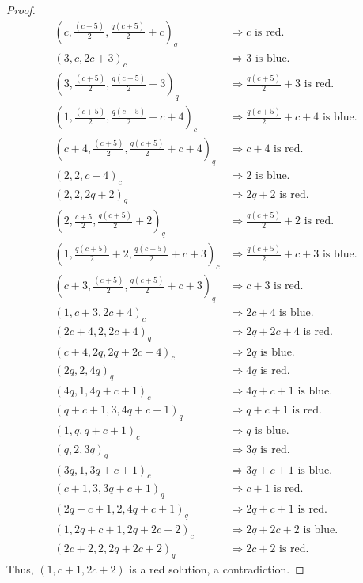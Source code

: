 \documentclass[10pt,a4paper]{amsart}
\begin{document}
\begin{proof}
\begin{align*}
(c,\tfrac{(c+5)}{2},\tfrac{q(c+5)}{2}+c)_q&\Longrightarrow c \text{ is red.}\\
(3,c,2c+3)_c&\Longrightarrow 3 \text{ is blue.}\\
(3,\tfrac{(c+5)}{2},\tfrac{q(c+5)}{2}+3)_q&\Longrightarrow \tfrac{q(c+5)}{2}+3 \text{ is red.}\\
(1,\tfrac{(c+5)}{2},\tfrac{q(c+5)}{2}+c+4)_c&\Longrightarrow \tfrac{q(c+5)}{2}+c+4\text{ is blue.}\\
(c+4,\tfrac{(c+5)}{2},\tfrac{q(c+5)}{2}+c+4)_q&\Longrightarrow c+4\text{ is red.}\\
(2,2,c+4)_c&\Longrightarrow 2 \text{ is blue.}\\
(2,2,2q+2)_q&\Longrightarrow 2q+2 \text{ is red.}\\
(2,\tfrac{c+5}{2},\tfrac{q(c+5)}{2}+2)_q&\Longrightarrow \tfrac{q(c+5)}{2}+2 \text{ is red.}\\
(1,\tfrac{q(c+5)}{2}+2,\tfrac{q(c+5)}{2}+c+3)_c&\Longrightarrow \tfrac{q(c+5)}{2}+c+3 \text{ is blue.}\\
(c+3,\tfrac{(c+5)}{2},\tfrac{q(c+5)}{2}+c+3)_q&\Longrightarrow c+3 \text{ is red.}\\
(1,c+3,2c+4)_c&\Longrightarrow 2c+4 \text{ is blue.}\\
(2c+4,2,2c+4)_q&\Longrightarrow 2q+2c+4 \text{ is red.}\\
(c+4,2q,2q+2c+4)_c&\Longrightarrow 2q \text{ is blue.}\\
(2q,2,4q)_q&\Longrightarrow 4q \text{ is red.}\\
(4q,1,4q+c+1)_c&\Longrightarrow 4q+c+1 \text{ is blue.}\\
(q+c+1,3,4q+c+1)_q&\Longrightarrow q+c+1 \text{ is red.}\\
(1,q,q+c+1)_c&\Longrightarrow q \text{ is blue.}\\
(q,2,3q)_q&\Longrightarrow 3q \text{ is red.}\\
(3q,1,3q+c+1)_c&\Longrightarrow 3q+c+1 \text{ is blue.}\\
(c+1,3,3q+c+1)_q&\Longrightarrow c+1 \text{ is red.}\\
(2q+c+1,2,4q+c+1)_q&\Longrightarrow 2q+c+1 \text{ is red.}\\
(1,2q+c+1,2q+2c+2)_c&\Longrightarrow 2q+2c+2 \text{ is blue.}\\
(2c+2,2,2q+2c+2)_q&\Longrightarrow 2c+2 \text{ is red.}
\end{align*}
Thus, $(1,c+1,2c+2)$ is a red solution, a contradiction.


\end{proof}
\end{document}
